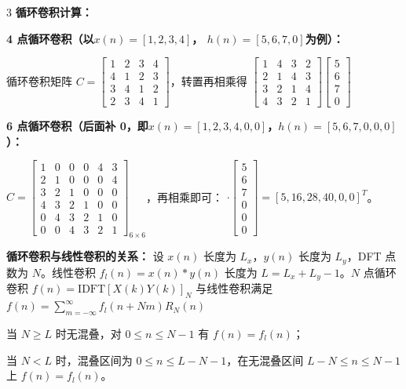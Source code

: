 \documentclass[10pt, a4paper, landscape]{article}
\begin{document}
\begin{multicols*}{3}
\textbf{循环卷积计算：}

\textbf{4 点循环卷积（以$x(n)=[1,2,3,4]$， $h(n)=[5,6,7,0]$为例）：}

循环卷积矩阵 $C\!=\!\begin{bmatrix} 1 & 2 & 3 & 4 \\ 4 & 1 & 2 & 3 \\ 3 & 4 & 1 & 2 \\ 2 & 3 & 4 & 1 \end{bmatrix}$，转置再相乘得 $\begin{bmatrix} 1 & 4 & 3 & 2 \\ 2 & 1 & 4 & 3 \\ 3 & 2 & 1 & 4 \\ 4 & 3 & 2 & 1 \end{bmatrix}\begin{bmatrix} 5 \\ 6 \\ 7 \\ 0 \end{bmatrix}$ 

\textbf{6 点循环卷积（后面补 0，即$x(n)=[1,2,3,4,0,0]$，$h(n)=[5,6,7,0,0,0]$）：}

$C\!=\!\begin{bmatrix} 1 & 0 & 0 & 0 & 4 & 3 \\ 2 & 1 & 0 & 0 & 0 & 4 \\ 3 & 2 & 1 & 0 & 0 & 0 \\ 4 & 3 & 2 & 1 & 0 & 0 \\ 0 & 4 & 3 & 2 & 1 & 0 \\ 0 & 0 & 4 & 3 & 2 & 1 \end{bmatrix}_{6\times 6}$，再相乘即可：
$\cdot \begin{bmatrix} 5 \\ 6 \\ 7 \\ 0 \\ 0 \\ 0 \end{bmatrix}=[5,16,28,40,0,0]^T$。

\textbf{循环卷积与线性卷积的关系：}
设 $x(n)$ 长度为 $L_x$，$y(n)$ 长度为 $L_y$，DFT 点数为 $N$。线性卷积 $f_l(n)=x(n)*y(n)$ 长度为 $L=L_x+L_y-1$。$N$ 点循环卷积 $f(n)=\mathrm{IDFT}[X(k)Y(k)]_N$ 与线性卷积满足
$f(n) = \sum_{m=-\infty}^{\infty} f_l(n+Nm) R_N(n)$

当 $N \ge L$ 时无混叠，对 $0 \le n \le N-1$ 有 $f(n)=f_l(n)$；

当 $N < L$ 时，混叠区间为 $0 \le n \le L-N-1$，在无混叠区间 $L-N \le n \le N-1$ 上 $f(n)=f_l(n)$。


\end{multicols*}
\end{document}
